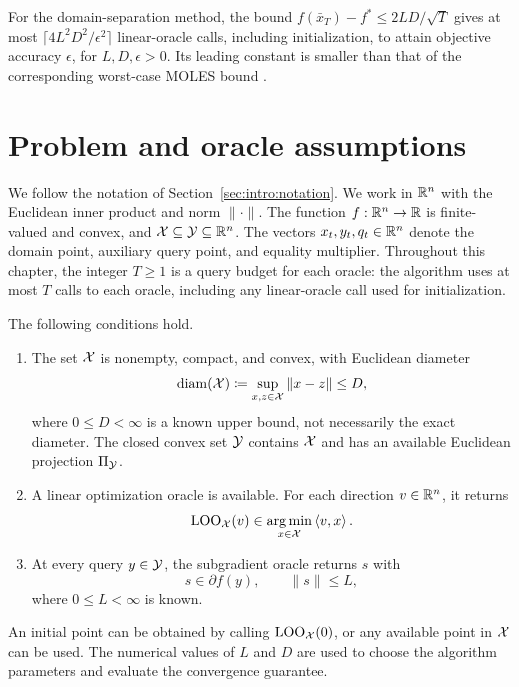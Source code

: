 For the domain-separation method, the bound
$f(\bar x_T)-f^*\leq2LD/\sqrt T$ gives at most
$\lceil4L^2D^2/\epsilon^2\rceil$ linear-oracle calls, including initialization,
to attain objective accuracy $\epsilon$, for $L,D,\epsilon>0$.
Its leading constant is smaller than that of the corresponding worst-case
MOLES bound
\cite[Appendix~C.2.2]{thekumparampil2020projection}.

\section{Problem and oracle assumptions}
\label{sec:pfdom:setup}

We follow the notation of Section~\ref{sec:intro:notation}.
We work in $\mathbb{R}^n$ with the Euclidean inner product and norm $\|\cdot\|$.
The function $f:\mathbb{R}^n\to\mathbb{R}$ is finite-valued and convex, and
$\mathcal{X}\subseteq\mathcal{Y}\subseteq\mathbb{R}^n$.
The vectors $x_t,y_t,q_t\in\mathbb{R}^n$ denote the domain point, auxiliary query point,
and equality multiplier. Throughout this chapter, the integer $T\geq1$ is a query
budget for each oracle: the algorithm uses at most $T$ calls to each oracle,
including any linear-oracle call used for initialization.

\begin{Thm:Assumption}\label{ass:pfdom:oracles}
The following conditions hold.
\begin{singlespace}
\begin{enumerate}[label=(\roman*)]
\item The set $\mathcal{X}$ is nonempty, compact, and convex, with Euclidean diameter
\[
    \operatorname{diam}(\mathcal{X})\coloneqq\sup_{x,z\in\mathcal{X}}\|x-z\|\leq D,
\]
where $0\leq D<\infty$ is a known upper bound, not necessarily the exact diameter.
The closed convex set $\mathcal{Y}$ contains $\mathcal{X}$ and has an
available Euclidean projection $\Pi_{\mathcal{Y}}$.
\item A linear optimization oracle is available. For each direction
$v\in\mathbb{R}^n$, it returns
\[
    \operatorname{LOO}_{\mathcal{X}}(v)\in\operatorname*{arg\,min}_{x\in\mathcal{X}}\left\langle v,x \right\rangle.
\]
\item At every query $y\in\mathcal{Y}$, the subgradient oracle returns $s$ with
\[
    s\in\partial f(y),\qquad \|s\|\leq L,
\]
where $0\leq L<\infty$ is known.
\end{enumerate}
\end{singlespace}
\end{Thm:Assumption}

An initial point can be obtained by calling $\operatorname{LOO}_{\mathcal{X}}(0)$,
or any available point in $\mathcal{X}$ can be used. The numerical values of $L$
and $D$ are used to choose the algorithm parameters and evaluate the
convergence guarantee.

